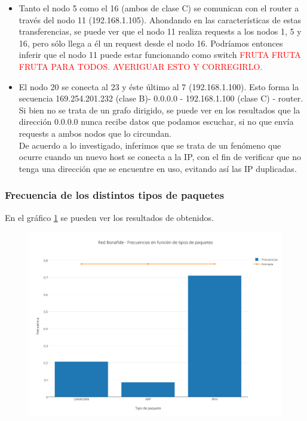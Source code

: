 \begin{itemize}
	\item Tanto el nodo 5 como el 16 (ambos de clase C) se comunican con el router a trav\'es del nodo 11 (192.168.1.105). Ahondando en las caracter\'isticas de estas transferencias, se puede ver que el nodo 11 realiza requests a los nodos 1, 5 y 16, pero s\'olo llega a \'el un request desde el nodo 16. Podr\'iamos entonces inferir que el nodo 11 puede estar funcionando como switch \textcolor{red}{FRUTA FRUTA FRUTA PARA TODOS. AVERIGUAR ESTO Y CORREGIRLO.}
	\item El nodo 20 se conecta al 23 y \'este \'ultimo al 7 (192.168.1.100). Esto forma la secuencia 169.254.201.232 (clase B)- 0.0.0.0 - 192.168.1.100 (clase C) - router. Si bien no se trata de un grafo dirigido, se puede ver en los resultados que la direcci\'on 0.0.0.0 nunca recibe datos que podamos escuchar, si no que env\'ia requests a ambos nodos que lo circundan.\\ De acuerdo a lo investigado, inferimos que se trata de un fen\'omeno que ocurre cuando un nuevo host se conecta a la IP, con el fin de verificar que no tenga una direcci\'on que se encuentre en uso, evitando as\'i las IP duplicadas.\\
\end{itemize}


\subsubsection{Frecuencia de los distintos tipos de paquetes}

En el gr\'afico \ref{bonafidePaquetes} se pueden ver los resultados de obtenidos.

\begin{figure}[h!]
    \centering                                                       
    \includegraphics[width=400pt]{img/BonafideFrecuenciaVsTipoPaquetes}
    \caption{}
    \label{bonafidePaquetes}
\end{figure}

